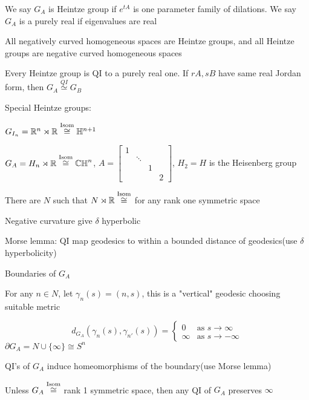 \documentclass[main]{subfiles}
\begin{document}
We say $G_A$ is Heintze group if $e^{tA}$ is one parameter family of dilations. We say $G_A$ is a purely real if eigenvalues are real

\begin{theorem}[Heintze]
All negatively curved homogeneous spaces are Heintze groups, and all Heintze groups are negative curved homogeneous spaces
\end{theorem}

\begin{exercise}
Every Heintze group is QI to a purely real one. If $rA,sB$ have same real Jordan form, then $G_A\overset{QI}{\simeq}G_B$
\end{exercise}

Special Heintze groups:

$G_{I_n}=\mathbb R^n\rtimes\mathbb R\overset{\operatorname{Isom}}{\cong}\mathbb H^{n+1}$

$G_A=H_n\rtimes\mathbb R\overset{\operatorname{Isom}}{\cong}\mathbb{CH}^n$, $A=\begin{bmatrix}
1\\
&\ddots \\
&&1\\
&&&2
\end{bmatrix}$, $H_2=H$ is the Heisenberg group

There are $N$ such that $N\rtimes\mathbb R\overset{\operatorname{Isom}}{\cong}$ for any rank one symmetric space

Negative curvature give $\delta$ hyperbolic

Morse lemma: QI map geodesics to within a bounded distance of geodesics(use $\delta$ hyperbolicity)

Boundaries of $G_A$

For any $n\in N$, let $\gamma_n(s)=(n,s)$, this is a "vertical" geodesic choosing suitable metric

\[d_{G_A}(\gamma_n(s),\gamma_{n'}(s))=\begin{cases}
0&\text{as }s\to\infty \\
\infty&\text{as }s\to-\infty
\end{cases}\]
$\partial G_A=N\cup\{\infty\}\cong S^n$

\begin{fact}
QI's of $G_A$ induce homeomorphisms of the boundary(use Morse lemma)
\end{fact}

\begin{conjecture}
Unless $G_A\overset{\operatorname{Isom}}{\cong}$ rank 1 symmetric space, then any QI of $G_A$ preserves $\infty$
\end{conjecture}
\end{document}
